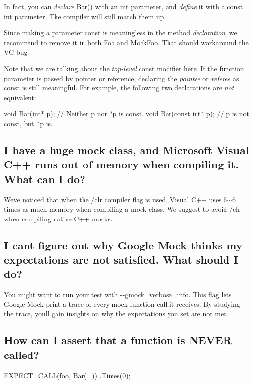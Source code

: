 In fact, you can {\itshape declare} Bar() with an {\ttfamily int} parameter, and {\itshape define} it with a {\ttfamily const int} parameter. The compiler will still match them up.

Since making a parameter {\ttfamily const} is meaningless in the method {\itshape declaration}, we recommend to remove it in both {\ttfamily Foo} and {\ttfamily Mock\+Foo}. That should workaround the VC bug.

Note that we are talking about the {\itshape top-\/level} {\ttfamily const} modifier here. If the function parameter is passed by pointer or reference, declaring the {\itshape pointee} or {\itshape referee} as {\ttfamily const} is still meaningful. For example, the following two declarations are {\itshape not} equivalent\+: 
\begin{DoxyCode}
void Bar(int* p);        // Neither p nor *p is const.
void Bar(const int* p);  // p is not const, but *p is.
\end{DoxyCode}


\subsection*{I have a huge mock class, and Microsoft Visual C++ runs out of memory when compiling it. What can I do?}

We\textquotesingle{}ve noticed that when the {\ttfamily /clr} compiler flag is used, Visual C++ uses 5$\sim$6 times as much memory when compiling a mock class. We suggest to avoid {\ttfamily /clr} when compiling native C++ mocks.

\subsection*{I can\textquotesingle{}t figure out why Google Mock thinks my expectations are not satisfied. What should I do?}

You might want to run your test with {\ttfamily -\/-\/gmock\+\_\+verbose=info}. This flag lets Google Mock print a trace of every mock function call it receives. By studying the trace, you\textquotesingle{}ll gain insights on why the expectations you set are not met.

\subsection*{How can I assert that a function is N\+E\+V\+ER called?}


\begin{DoxyCode}
EXPECT\_CALL(foo, Bar(\_))
    .Times(0);
\end{DoxyCode}


